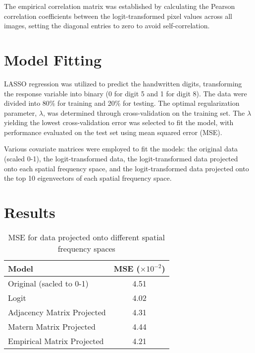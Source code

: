 \documentclass[12pt]{article}
\begin{document}
The empirical correlation matrix was established by calculating the Pearson correlation coefficients between the logit-transformed pixel values across all images, setting the diagonal entries to zero to avoid self-correlation.


\section*{Model Fitting}

LASSO regression was utilized to predict the handwritten digits, transforming the response variable into binary (0 for digit 5 and 1 for digit 8). The data were divided into 80\% for training and 20\% for testing. The optimal regularization parameter, \(\lambda\), was determined through cross-validation on the training set. The \(\lambda\) yielding the lowest cross-validation error was selected to fit the model, with performance evaluated on the test set using mean squared error (MSE).

Various covariate matrices were employed to fit the models: the original data (scaled 0-1), the logit-transformed data, the logit-transformed data projected onto each spatial frequency space, and the logit-transformed data projected onto the top 10 eigenvectors of each spatial frequency space.

\section*{Results}

\begin{table}[h]
    \centering
    \begin{tabular}{l|c}
        \hline
        \textbf{Model}             & \textbf{MSE (\( \times 10^{-2} \))} \\
        \hline
        Original (sacled to 0-1)   & 4.51                                \\
        Logit                      & 4.02                                \\
        Adjacency Matrix Projected & 4.31                                \\
        Matern Matrix Projected    & 4.44                                \\
        Empirical Matrix Projected & 4.21                                \\
        \hline
    \end{tabular}
    \caption{MSE for data projected onto different spatial frequency spaces}
    \label{tab:full_projection_mse}
\end{table}
\end{document}
